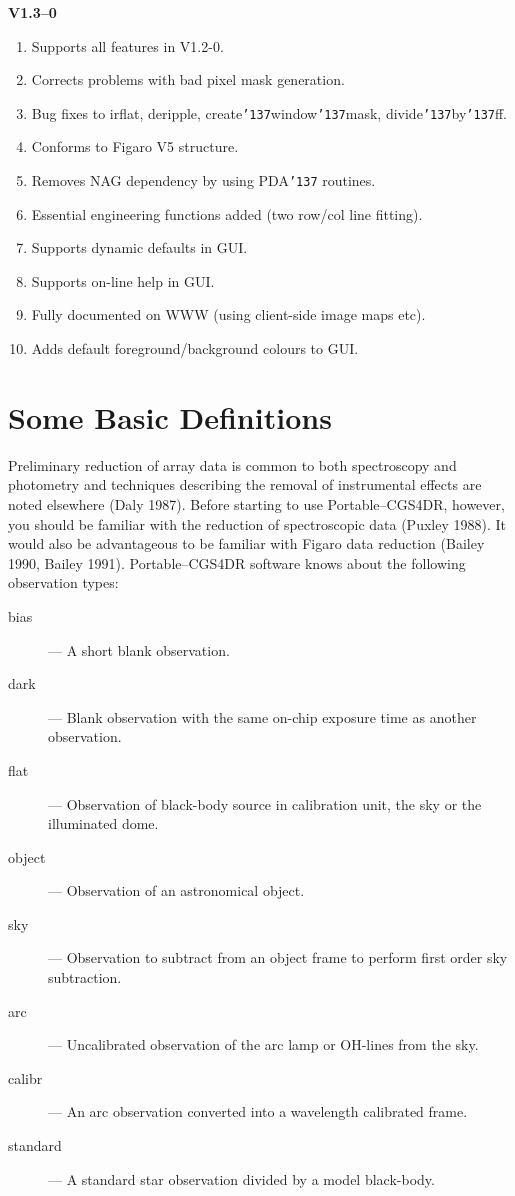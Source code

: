 \documentclass[a4paper]{book}
\renewcommand{\_}{{\tt\char'137}}
\begin{document}
\begin{description}
\begin{enumerate}
 \end{enumerate}
\item[] {\bf V1.3--0}
 \begin{enumerate}
  \item Supports all features in V1.2-0.
  \item Corrects problems with bad pixel mask generation.
  \item Bug fixes to irflat, deripple, create\_window\_mask, divide\_by\_ff.
  \item Conforms to Figaro V5 structure.
  \item Removes NAG dependency by using PDA\_ routines.
  \item Essential engineering functions added (two row/col line fitting).
  \item Supports dynamic defaults in GUI.
  \item Supports on-line help in GUI.
  \item Fully documented on WWW (using client-side image maps etc).
  \item Adds default foreground/background colours to GUI.
 \end{enumerate}
\end{description}

\section{Some Basic Definitions}
Preliminary reduction of array data is common to both spectroscopy and
photometry and techniques describing the removal of instrumental
effects are noted elsewhere (Daly 1987). Before starting to use
Portable--CGS4DR, however, you should be familiar with the reduction of
spectroscopic data (Puxley 1988).  It would also be advantageous to be
familiar with Figaro data reduction (Bailey 1990, Bailey 1991).
Portable--CGS4DR software knows about the following observation types:

\begin{description}
\item[{\sc bias}]--- A short blank observation.
\item[{\sc dark}]--- Blank observation with the same on-chip exposure time as 
 another observation.
\item[{\sc flat}]--- Observation of black-body source in calibration unit, 
 the sky or the illuminated dome.
\item[{\sc object}]--- Observation of an astronomical object.
\item[{\sc sky}]--- Observation to subtract from an {\sc object} frame to 
 perform first order sky subtraction. 
\item[{\sc arc}]--- Uncalibrated observation of the arc lamp or OH-lines from
 the sky. 
\item[{\sc calibr}]--- An {\sc arc} observation converted into a wavelength 
 calibrated frame.
\item[{\sc standard}]--- A standard star observation divided by a model 
 black-body.
\end{description}
\end{document}
